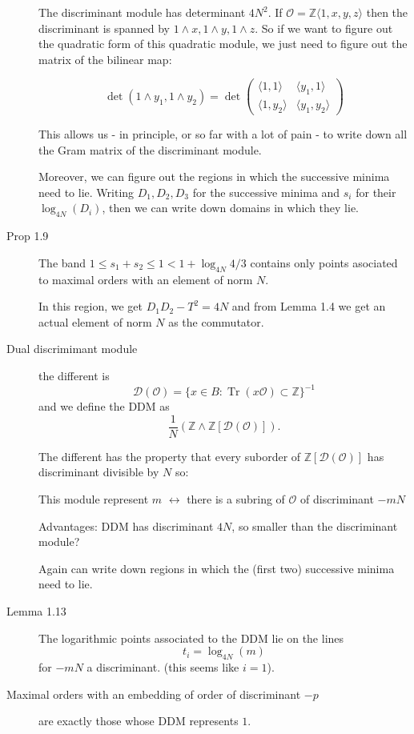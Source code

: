 \documentclass[12pt]{report}
\newcommand{\Z}{\mathbb{Z}}
\newcommand{\Tr}{\operatorname{Tr}}
\renewcommand{\O}{\mathcal{O}}
\newcommand{\different}{\mathcal{D}(\O) }
\begin{document}
\begin{description}
The discriminant module has determinant $4N^2$. If $\O = \Z \langle 1, x, y, z\rangle$ then the discriminant is spanned by $1 \wedge x, 1 \wedge y, 1 \wedge z$. So if we want to figure out the quadratic form of this quadratic module, we just need to figure out the matrix of the bilinear map:

 \[ \det( 1 \wedge y_1, 1 \wedge y_2) = \det \left( \begin{matrix}
 \langle 1, 1 \rangle & \langle y_1, 1 \rangle \\ \langle 1, y_2 \rangle & \langle y_1, y_2 \rangle
\end{matrix}  \right) \]

This allows us - in principle, or so far with a lot of pain - to write down all the Gram matrix of the discriminant module.

Moreover, we can figure out the regions in which the successive minima need to lie. Writing $D_1, D_2, D_3$ for the successive minima and $s_i$ for their $\log_{4N}(D_i)$, then we can write down domains in which they lie. 

\item[Prop 1.9] The band $1 \leq s_1 + s_2 \leq 1< 1 + \log_{4N}{4/3}$ contains only points asociated to maximal orders with an element of norm $N$. 

In this region, we get $D_1 D_2 - T^2 = 4N$ and from Lemma 1.4 we get an actual element of norm $N$ as the commutator.


\item[Dual discrimimant module] the different is \[ \mathcal{D}(\O) = \{ x \in B : \Tr(x\O) \subset \Z \}^{-1}\]
and we define the DDM as 
\[ \frac{1}{N}  \left( \Z \wedge \Z [\mathcal{D}(\O) ] \right).\]

The different has the property that every suborder of $\Z[\different]$ has discriminant divisible by $N$ so: 
\begin{center}
This module represent $m$ $\leftrightarrow$ there is a subring of $\O$ of discriminant $-mN$ 
\end{center}
Advantages: DDM has discriminant $4N$, so smaller than the discriminant module?

Again can write down regions in which the (first two) successive minima need to lie. 

\item[Lemma 1.13] The logarithmic points associated to the DDM  lie on the lines \[  t_i = \log_{4N}(m)\] for $-mN$ a discriminant. (this seems like $i = 1$).

\item[Maximal orders with an embedding of order of discriminant $-p$] are exactly those whose DDM represents $1$. 


\end{description}
\end{document}
